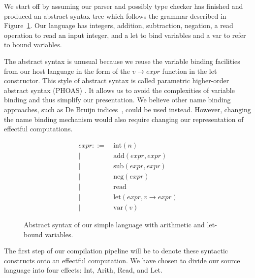 \documentclass[a4paper,UKenglish,cleveref, autoref, thm-restate]{oasics-v2021}
\begin{document}
We start off by assuming our parser and possibly type checker has finished and produced an abstract syntax tree which follows the grammar described in Figure~\ref{fig:source-absyn}.
Our language has integers, addition, subtraction, negation, a read operation to read an input integer, and a let to bind variables and a var to refer to bound variables.

The abstract syntax is unusual because we reuse the variable binding facilities from our host language in the form of the $\mathit{v} \to \mathit{expr}$ function in the let constructor.
This style of abstract syntax is called parametric higher-order abstract syntax (PHOAS) \cite{10.1145/1411203.1411226}.
It allows us to avoid the complexities of variable binding and thus simplify our presentation.
We believe other name binding approaches, such as De Bruijn indices~\cite{DEBRUIJN1972381}, could be used instead.
However, changing the name binding mechanism would also require changing our representation of effectful computations.

\begin{figure}[ht]
  \begin{align*}
    \mathit{expr} ::= &\ \mathrm{int}(n) \\
           | &\ \mathrm{add}(\mathit{expr},\mathit{expr}) \\
           | &\ \mathrm{sub}(\mathit{expr},\mathit{expr}) \\
           | &\ \mathrm{neg}(\mathit{expr}) \\
           | &\ \mathrm{read} \\
           | &\ \mathrm{let}(\mathit{expr}, \mathit{v} \to \mathit{expr}) \\
           | &\ \mathrm{var}(\mathit{v})
  \end{align*}
  \caption{Abstract syntax of our simple language with arithmetic and let-bound variables.}\label{fig:source-absyn}
\end{figure}

The first step of our compilation pipeline will be to denote these syntactic constructs onto an effectful computation.
We have chosen to divide our source language into four effects: Int, Arith, Read, and Let.
\end{document}
